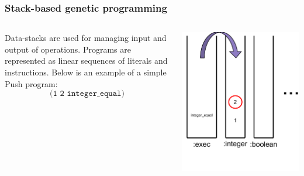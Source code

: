 \documentclass{beamer}
\newcommand{\linespace}{\vskip 0.25cm}
\begin{document}
\begin{frame}
	\frametitle{Stack-based genetic programming}
	\begin{columns}
		\begin{column}{0.6\textwidth}
			Data-stacks are used for managing input and output of operations.
			\linespace
			\linespace
			\linespace
			Programs are represented as linear sequences of literals and instructions. Below is an example of a simple Push program:
			\[\texttt{(1 2 integer\_equal)}\]
		\end{column}
		\begin{column}{0.4\textwidth}
			\includegraphics[height=1.2\textwidth]{Illustrations/stack_4.PDF}
		\end{column}
	\end{columns}
\end{frame}
\end{document}
